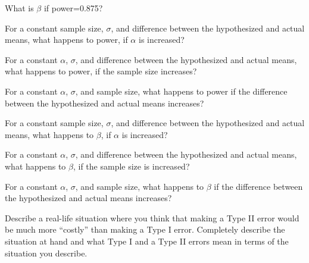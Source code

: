 \documentclass[10pt,openany]{book}\usepackage[]{graphicx}\usepackage[]{color}
\begin{document}
\begin{exsection}
  \item \label{revex:HypTPower1} What is $\beta$ if power=0.875? 
  \item \label{revex:HypTPowerAlpha} For a constant sample size, $\sigma$, and difference between the hypothesized and actual means, what happens to power, if $\alpha$ is increased?  
  \item \label{revex:HypTPowern} For a constant $\alpha$, $\sigma$, and difference between the hypothesized and actual means, what happens to power, if the sample size increases? 
  \item \label{revex:HypTPowerMu} For a constant $\alpha$, $\sigma$, and sample size, what happens to power if the difference between the hypothesized and actual means increases? 
  \item \label{revex:HypTBetaAlpha} For a constant sample size, $\sigma$, and difference between the hypothesized and actual means, what happens to $\beta$, if $\alpha$ is increased? 
  \item \label{revex:HypTBetan} For a constant $\alpha$, $\sigma$, and difference between the hypothesized and actual means, what happens to $\beta$, if the sample size is increased? 
  \item \label{revex:HypTBetaMu} For a constant $\alpha$, $\sigma$, and sample size, what happens to $\beta$ if the difference between the hypothesized and actual means increases? 
  \item \label{revex:HypTRealLife} Describe a real-life situation where you think that making a Type II error would be much more ``costly'' than making a Type I error.  Completely describe the situation at hand and what Type I and a Type II errors mean in terms of the situation you describe. 
\end{exsection}
\end{document}
